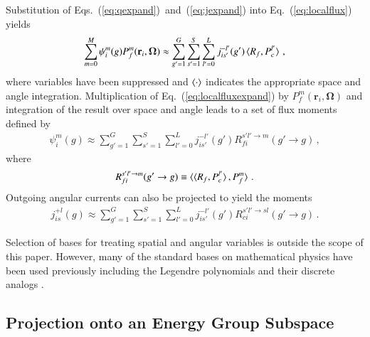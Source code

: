 \documentclass[5p,times,twocolumn,10pt]{elsarticle}
\newcommand{\EQ}[1]{Eq.~(\ref{#1})}               %
\newcommand{\EQSTWO}[2]{Eqs.~(\ref{#1})~and~(\ref{#2})}
\begin{document}
    Substitution of \EQSTWO{eq:qexpand}{eq:jexpand} into \EQ{eq:localflux} 
    yields
    \begin{equation}
        \begin{split}
            \sum^M_{m=0} \psi_{i}^m(g) P^m_f(\mathbf{r}_i,\bm{\Omega}) 
            \approx  
            \sum^{G}_{g'=1}  \sum^{S}_{s'=1} \sum_{l'=0}^L  j^{-l'}_{is'}(g') 
            \braket{ R_{f}, P^{l'}_c }    \, ,             
        \end{split}           
        \label{eq:localfluxexpand}
    \end{equation}
    where variables have been suppressed and $\braket{\cdot}$ indicates the 
    appropriate space and angle integration. Multiplication of 
    \EQ{eq:localfluxexpand} by $P^{m}_{f}(\mathbf{r}_i, \bm{\Omega})$
    and integration of the result over space and angle leads to a set of 
    flux moments defined by
    \begin{equation}
        \begin{split}
            \psi^{m}_{i}(g) \approx 
            \sum^{G}_{g'=1} \sum^{S}_{s'=1} \sum_{l'=0}^L  
            j^{-l'}_{is'}(g') R^{s'l' \to m}_{fi}(g'\rightarrow g)  \, ,
        \end{split}           
        \label{eq:fluxmoments}
    \end{equation}
    where
    \begin{equation}
        R^{s'l' \to m}_{fi}(g'\rightarrow g) \equiv  
        \braket{ \braket{ R_{f}, P^{l'}_c}, P^{m}_f} \, .
    \end{equation}
    Outgoing angular currents can also be projected to yield the moments
    \begin{equation}
        \begin{split}
            j^{+l}_{is}(g) \approx 
            \sum^{G}_{g'=1} \sum^{S}_{s'=1} \sum_{l'=0}^L  
            j^{-l'}_{is'}(g') R^{s'l' \to sl}_{ci}(g'\rightarrow g)  \, .
        \end{split}              
        \label{eq:jmoments}
    \end{equation}
    
    Selection of bases for treating spatial and angular variables is outside 
    the scope of this paper.  However, many of the standard bases on 
    mathematical physics have been used previously including the Legendre 
    polynomials and their discrete analogs \cite{RobertsSerment}.
    
    \subsection{Projection onto an Energy Group Subspace}
    
\end{document}
